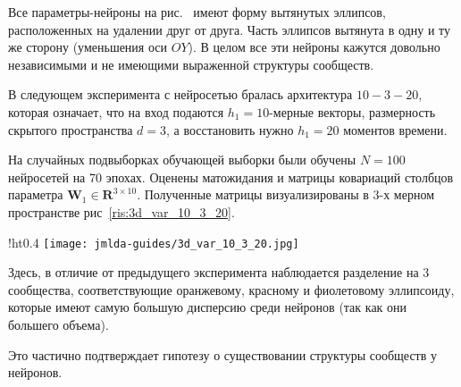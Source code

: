 \documentclass[12pt, twoside]{article}
\begin{document}
Все параметры-нейроны на рис.~\cite{ris:2nn_total_gauss_3d_conf} имеют форму вытянутых эллипсов, расположенных на удалении друг от друга. Часть эллипсов вытянута в одну и ту же сторону (уменьшения оси $OY$). В целом все эти нейроны кажутся довольно независимыми и не имеющими выраженной структуры сообществ.

В следующем эксперимента с нейросетью бралась архитектура $10-3-20$, которая означает, что на вход подаются $h_1=10$-мерные векторы, размерность скрытого пространства $d=3$, а восстановить нужно $h_1=20$ моментов времени.

На случайных подвыборках обучающей выборки были обучены $N=100$ нейросетей на 70 эпохах. Оценены матожидания и матрицы ковариаций столбцов параметра $\mathbf{W}_1 \in \mathbf{R}^{3 \times 10}$. Полученные матрицы визуализированы в 3-х мерном пространстве рис~\ref{ris:3d_var_10_3_20}.

\begin{wrapfigure}{!ht}{0.4\textwidth}
\texttt{[image: jmlda-guides/3d\_var\_10\_3\_20.jpg]}
\caption{Доверительные области 3-х мерных векторов двуслойной нейросети арихитектуры 10-3-20.}
\label{ris:3d_var_10_3_20}
\end{wrapfigure}

Здесь, в отличие от предыдущего эксперимента наблюдается разделение на 3 сообщества, соответствующие оранжевому, красному и фиолетовому эллипсоиду, которые имеют самую большую дисперсию среди нейронов (так как они большего объема).

Это частично подтверждает гипотезу о существовании структуры сообществ у нейронов.
\newpage


\end{document}
